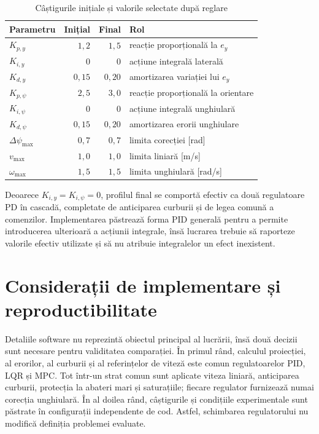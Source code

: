 \documentclass[12pt,a4paper,oneside]{report}
\begin{document}
\begin{table}[htbp]
  \centering
  \caption{Câștigurile inițiale și valorile selectate după reglare}
  \label{tab:cascade-gains}
  \begin{tabular}{lrrl}
    \toprule
    Parametru & Inițial & Final & Rol \\
    \midrule
    $K_{p,y}$ & $1{,}2$ & $1{,}5$ & reacție proporțională la $e_y$ \\
    $K_{i,y}$ & $0$ & $0$ & acțiune integrală laterală \\
    $K_{d,y}$ & $0{,}15$ & $0{,}20$ & amortizarea variației lui $e_y$ \\
    $K_{p,\psi}$ & $2{,}5$ & $3{,}0$ & reacție proporțională la orientare \\
    $K_{i,\psi}$ & $0$ & $0$ & acțiune integrală unghiulară \\
    $K_{d,\psi}$ & $0{,}15$ & $0{,}20$ & amortizarea erorii unghiulare \\
    $\Delta\psi_{\max}$ & $0{,}7$ & $0{,}7$ & limita corecției [rad] \\
    $v_{\max}$ & $1{,}0$ & $1{,}0$ & limita liniară [m/s] \\
    $\omega_{\max}$ & $1{,}5$ & $1{,}5$ & limita unghiulară [rad/s] \\
    \bottomrule
  \end{tabular}
\end{table}

Deoarece $K_{i,y}=K_{i,\psi}=0$, profilul final se comportă efectiv ca două
regulatoare PD în cascadă, completate de anticiparea curburii și de legea
comună a comenzilor. Implementarea păstrează forma PID generală pentru a permite
introducerea ulterioară a acțiunii integrale, însă lucrarea trebuie să raporteze
valorile efectiv utilizate și să nu atribuie integralelor un efect inexistent.

\chapter{Considerații de implementare și reproductibilitate}

Detaliile software nu reprezintă obiectul principal al lucrării, însă două
decizii sunt necesare pentru validitatea comparației. În primul rând, calculul
proiecției, al erorilor, al curburii și al referințelor de viteză este comun
regulatoarelor PID, LQR și MPC. Tot într-un strat comun sunt aplicate viteza
liniară, anticiparea curburii, protecția la abateri mari și saturațiile; fiecare
regulator furnizează numai corecția unghiulară. În al doilea rând, câștigurile și condițiile
experimentale sunt păstrate în configurații independente de cod. Astfel,
schimbarea regulatorului nu modifică definiția problemei evaluate.
\end{document}
